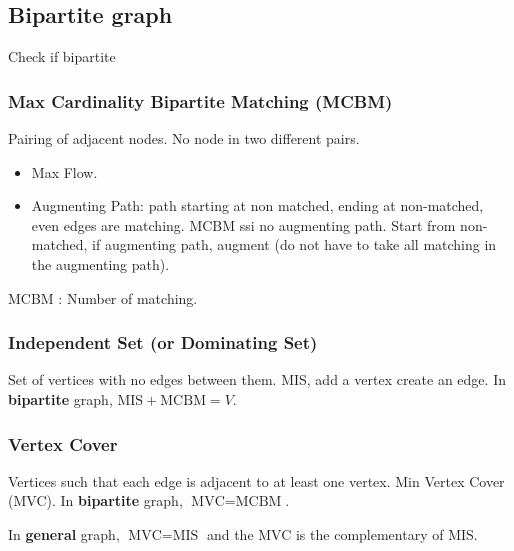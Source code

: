 \subsection{Bipartite graph}
Check if bipartite

\subsubsection{Max Cardinality Bipartite Matching (MCBM)}
Pairing of adjacent nodes. No node in two different pairs.
\begin{itemize}
    \item Max Flow.
    \item Augmenting Path: path starting at non matched, ending
        at non-matched, even edges are matching.
        MCBM ssi no augmenting path.
        Start from non-matched, if augmenting path, augment
        (do not have to take all matching in the augmenting path).
\end{itemize}
MCBM : Number of matching.
\subsubsection{Independent Set (or Dominating Set)}
Set of vertices with no edges between them.
MIS, add a vertex create an edge.
In \textbf{bipartite} graph,
$\text{MIS} + \text{MCBM} = V$.

\subsubsection{Vertex Cover}
Vertices such that each edge is adjacent to at least one vertex.
Min Vertex Cover (MVC). In \textbf{bipartite} graph,
$\text{MVC} = \text{MCBM}$.

In \textbf{general} graph,
$\text{MVC} = \text{MIS}$ and the MVC is the complementary of MIS.


